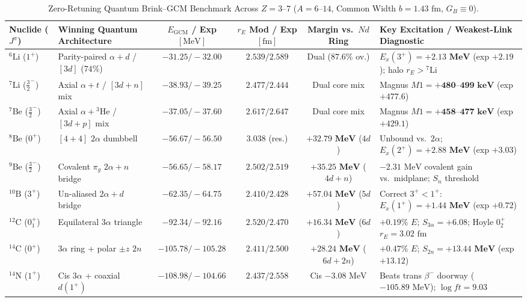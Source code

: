 \documentclass[11pt, a4paper]{article}
\begin{document}
\begin{table}[!htbp]
\centering
\caption{Zero-Retuning Quantum Brink--GCM Benchmark Across $Z = 3\text{--}7$ ($A = 6\text{--}14$, Common Width $b = 1.43\text{ fm}$, $G_B \equiv 0$).}
\label{tab:z3_to_z7_quantum_ledger}
\scriptsize
\setlength{\tabcolsep}{3.6pt}
\renewcommand{\arraystretch}{1.16}
\begin{tabularx}{\textwidth}{l l c c c >{\raggedright\arraybackslash}X}
\toprule
Nuclide ($J^\pi$) & Winning Quantum Architecture & $E_{\mathrm{GCM}}$ / Exp $[\text{MeV}]$ & $r_E$ Mod / Exp $[\text{fm}]$ & Margin vs.\ $Nd$ Ring & Key Excitation / Weakest-Link Diagnostic \\
\midrule
$^6\text{Li}$ ($1^+$) & Parity-paired $\alpha + d$ / $[3d]$ ($74\%$) & $\mathbf{-31.25} / -32.00$ & $\mathbf{2.539} / 2.589$ & Dual ($87.6\%$ ov.) & $E_x(3^+) = \mathbf{+2.13\text{ MeV}}$ (exp $+2.19$); halo $r_E > {}^7\text{Li}$ \\
$^7\text{Li}$ ($\frac{3}{2}^-$) & Axial $\alpha + t$ / $[3d+n]$ mix & $\mathbf{-38.93} / -39.25$ & $\mathbf{2.477} / 2.444$ & Dual core mix & Magnus $M1 = \mathbf{+480\text{--}499\text{ keV}}$ (exp $+477.6$) \\
$^7\text{Be}$ ($\frac{3}{2}^-$) & Axial $\alpha + {}^3\text{He}$ / $[3d+p]$ mix & $\mathbf{-37.05} / -37.60$ & $\mathbf{2.617} / 2.647$ & Dual core mix & Magnus $M1 = \mathbf{+458\text{--}477\text{ keV}}$ (exp $+429.1$) \\
$^8\text{Be}$ ($0^+$) & $[4+4]$ $2\alpha$ dumbbell & $\mathbf{-56.67} / -56.50$ & $3.038$ (res.) & $\mathbf{+32.79\text{ MeV}}$ ($4d$) & Unbound vs.\ $2\alpha$; $E_x(2^+) = \mathbf{+2.88\text{ MeV}}$ (exp $+3.03$) \\
$^9\text{Be}$ ($\frac{3}{2}^-$) & Covalent $\pi_g$ $2\alpha + n$ bridge & $\mathbf{-56.65} / -58.17$ & $\mathbf{2.502} / 2.519$ & $\mathbf{+35.25\text{ MeV}}$ ($4d{+}n$) & $-2.31\text{ MeV}$ covalent gain vs.\ midplane; $S_n$ threshold \\
$^{10}\text{B}$ ($3^+$) & Un-aliased $2\alpha + d$ bridge & $\mathbf{-62.35} / -64.75$ & $\mathbf{2.410} / 2.428$ & $\mathbf{+57.04\text{ MeV}}$ ($5d$) & Correct $3^+ < 1^+$: $E_x(1^+) = \mathbf{+1.44\text{ MeV}}$ (exp $+0.72$) \\
$^{12}\text{C}$ ($0_1^+$) & Equilateral $3\alpha$ triangle & $\mathbf{-92.34} / -92.16$ & $\mathbf{2.520} / 2.470$ & $\mathbf{+16.34\text{ MeV}}$ ($6d$) & $+0.19\%$ $E$; $S_{3\alpha}=+6.08$; Hoyle $0_2^+$ $r_E = 3.02\text{ fm}$ \\
$^{14}\text{C}$ ($0^+$) & $3\alpha$ ring + polar $\pm z$ $2n$ & $\mathbf{-105.78} / -105.28$ & $\mathbf{2.411} / 2.500$ & $\mathbf{+28.24\text{ MeV}}$ ($6d{+}2n$) & $+0.47\%$ $E$; $S_{2n} = \mathbf{+13.44\text{ MeV}}$ (exp $+13.12$) \\
$^{14}\text{N}$ ($1^+$) & Cis $3\alpha$ + coaxial $d(1^+)$ & $\mathbf{-108.98} / -104.66$ & $\mathbf{2.437} / 2.558$ & Cis $-3.08\text{ MeV}$ & Beats trans $\beta^-$ doorway ($-105.89\text{ MeV}$); $\log ft = 9.03$ \\
\bottomrule
\end{tabularx}
\end{table}
\end{document}
